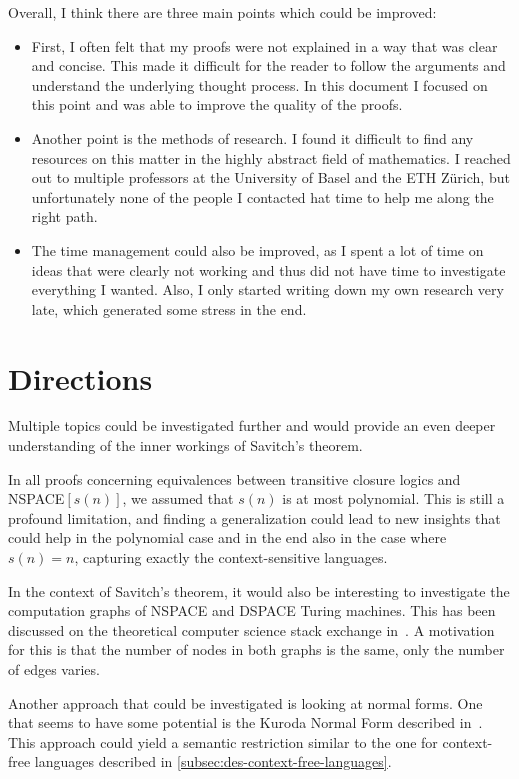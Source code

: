 Overall, I think there are three main points which could be improved:
\begin{itemize}
    \setlength\itemsep{0.2em}
    \item First, I often felt that my proofs were not explained in a way that was clear and concise.
    This made it difficult for the reader to follow the arguments and understand the underlying thought process.
    In this document I focused on this point and was able to improve the quality of the proofs.
    \item Another point is the methods of research.
    I found it difficult to find any resources on this matter in the highly abstract field of mathematics.
    I reached out to multiple professors at the University of Basel and the ETH Zürich, but unfortunately none of the people I contacted hat time to help me along the right path.
    \item The time management could also be improved, as I spent a lot of time on ideas that were clearly not working and thus did not have time to investigate everything I wanted.
    Also, I only started writing down my own research very late, which generated some stress in the end.
\end{itemize}

\section{Directions}\label{sec:directions}
Multiple topics could be investigated further and would provide an even deeper understanding of the inner workings of Savitch's theorem.

In all proofs concerning equivalences between transitive closure logics and NSPACE$[s(n)]$, we assumed that $s(n)$ is at most polynomial.
This is still a profound limitation, and finding a generalization could lead to new insights that could help in the polynomial case and in the end also in the case where $s(n) = n$, capturing exactly the context-sensitive languages.

In the context of Savitch's theorem, it would also be interesting to investigate the computation graphs of NSPACE and DSPACE Turing machines.
This has been discussed on the theoretical computer science stack exchange in~\cite{Barak2010}.
A motivation for this is that the number of nodes in both graphs is the same, only the number of edges varies.

Another approach that could be investigated is looking at normal forms.
One that seems to have some potential is the Kuroda Normal Form described in~\cite{Kuroda1964}.
This approach could yield a semantic restriction similar to the one for context-free languages described in \cref{subsec:des-context-free-languages}.

